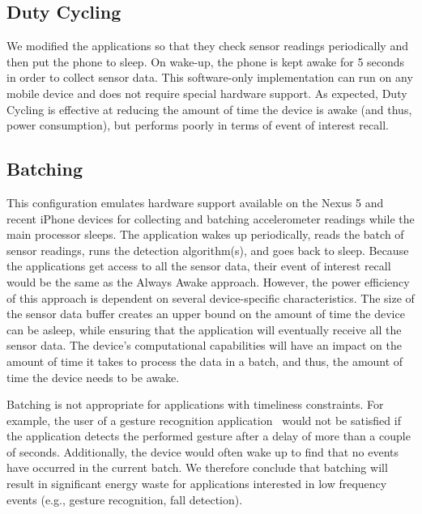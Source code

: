 \subsection{Duty Cycling} 

We modified the applications so that they check
sensor readings periodically and then put the phone to sleep.  On
wake-up, the phone is kept awake for 5 seconds in order to collect
sensor data.  This software-only implementation can run on any mobile 
device and does not require special hardware support. As expected, Duty Cycling is effective at reducing
the amount of time the device is awake (and thus, power consumption), but performs poorly in terms
of event of interest recall.



\subsection{Batching} 

This configuration emulates hardware support
available on the Nexus 5 and recent iPhone devices for collecting and batching accelerometer
readings while the main processor sleeps.  The application wakes up
periodically, reads the batch of sensor readings, runs the detection
algorithm(s), and goes back to sleep. Because the applications get access to all the sensor
data, their event of interest recall would be the same as the Always Awake approach. However, 
the power efficiency of this approach is dependent on 
several device-specific characteristics. The size of the sensor data buffer creates an upper bound
on the amount of time the device can be asleep, while ensuring that the application will 
eventually receive all the sensor data. The device's computational capabilities will have 
an impact on the amount of time it takes to process the data in a batch, and thus, the amount
of time the device needs to be awake. 

Batching is not appropriate for applications with timeliness
constraints.  For example, the user of a gesture recognition
application~\cite{liu2009uwave,schlomer2008gesture} would not be
satisfied if the application detects the performed gesture after a
delay of more than a couple of seconds. Additionally, the device would often wake up to find that no 
events have occurred in the current batch. We therefore conclude that 
batching will result in significant energy waste for applications 
interested in low frequency events (e.g., gesture recognition, fall 
detection).

